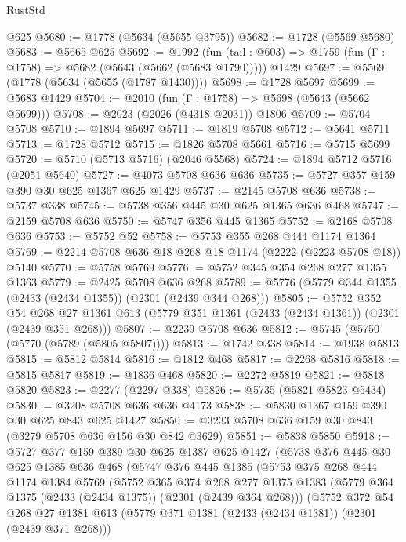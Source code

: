 \begin{lexlean}{RustStd}
\begin{coremodule}
{\begin{coremodule}
{{{{{{{{{{{{{    @625
@5680 := @1778 (@5634 (@5655 @3795))
@5682 := @1728 (@5569 @5680)
@5683 := @5665 @625
@5692 := @1992
    (fun (tail : @603) => @1759 (fun (Γ : @1758) => @5682 (@5643 (@5662 (@5683 @1790)))))
    @1429
@5697 := @5569 (@1778 (@5634 (@5655 (@1787 @1430))))
@5698 := @1728 @5697
@5699 := @5683 @1429
@5704 := @2010 (fun (Γ : @1758) => @5698 (@5643 (@5662 @5699)))
@5708 := @2023 (@2026 (@4318 @2031)) @1806
@5709 := @5704 @5708
@5710 := @1894 @5697
@5711 := @1819 @5708
@5712 := @5641 @5711
@5713 := @1728 @5712
@5715 := @1826 @5708 @5661
@5716 := @5715 @5699
@5720 := @5710 (@5713 @5716) (@2046 @5568)
@5724 := @1894 @5712 @5716 (@2051 @5640)
@5727 := @4073 @5708 @636 @636
@5735 := @5727 @357 @159 @390 @30 @625 @1367 @625 @1429
@5737 := @2145 @5708 @636
@5738 := @5737 @338
@5745 := @5738 @356 @445 @30 @625 @1365 @636 @468
@5747 := @2159 @5708 @636
@5750 := @5747 @356 @445 @1365
@5752 := @2168 @5708 @636
@5753 := @5752 @52
@5758 := @5753 @355 @268 @444 @1174 @1364
@5769 := @2214 @5708 @636 @18 @268 @18 @1174 (@2222 (@2223 @5708 @18)) @5140
@5770 := @5758 @5769
@5776 := @5752 @345 @354 @268 @277 @1355 @1363
@5779 := @2425 @5708 @636 @268
@5789 := @5776 (@5779 @344 @1355 (@2433 (@2434 @1355)) (@2301 (@2439 @344 @268)))
@5805 := @5752
    @352
    @54
    @268
    @27
    @1361
    @613
    (@5779 @351 @1361 (@2433 (@2434 @1361)) (@2301 (@2439 @351 @268)))
@5807 := @2239 @5708 @636
@5812 := @5745 (@5750 (@5770 (@5789 (@5805 @5807))))
@5813 := @1742 @338
@5814 := @1938 @5813
@5815 := @5812 @5814
@5816 := @1812 @468
@5817 := @2268 @5816
@5818 := @5815 @5817
@5819 := @1836 @468
@5820 := @2272 @5819
@5821 := @5818 @5820
@5823 := @2277 (@2297 @338)
@5826 := @5735 (@5821 @5823 @5434)
@5830 := @3208 @5708 @636 @636 @4173
@5838 := @5830 @1367 @159 @390 @30 @625 @843 @625 @1427
@5850 := @3233 @5708 @636 @159 @30 @843 (@3279 @5708 @636 @156 @30 @842 @3629)
@5851 := @5838 @5850
@5918 := @5727
    @377
    @159
    @389
    @30
    @625
    @1387
    @625
    @1427
    (@5738
      @376
      @445
      @30
      @625
      @1385
      @636
      @468
      (@5747
        @376
        @445
        @1385
        (@5753
          @375
          @268
          @444
          @1174
          @1384
          @5769
          (@5752
            @365
            @374
            @268
            @277
            @1375
            @1383
            (@5779 @364 @1375 (@2433 (@2434 @1375)) (@2301 (@2439 @364 @268)))
            (@5752
              @372
              @54
              @268
              @27
              @1381
              @613
              (@5779 @371 @1381 (@2433 (@2434 @1381)) (@2301 (@2439 @371 @268)))
}}}}}}}}}}}}}
\end{coremodule}}
\end{coremodule}
\end{lexlean}
